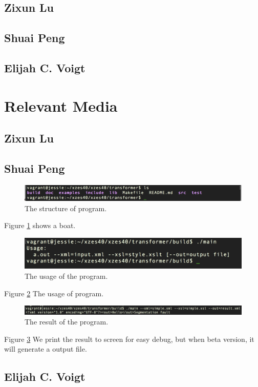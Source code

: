 \subsection{Zixun Lu}

\subsection{Shuai Peng}

\subsection{Elijah C. Voigt}


\section{Relevant Media}

\subsection{Zixun Lu}

\subsection{Shuai Peng}

\begin{figure}
  \includegraphics[width=\linewidth]{./figures/dir_of_program.png}
  \caption{The structure of program.}
  \label{fig:screen1}
\end{figure}
Figure \ref{fig:screen1} shows a boat.

\begin{figure}
  \includegraphics[width=\linewidth]{./figures/usage_of_program.png}
  \caption{The usage of the program.}
  \label{fig:screen2}
\end{figure}
Figure \ref{fig:screen2} The usage of program.

\begin{figure}
  \includegraphics[width=\linewidth]{./figures/result_of_program.png}
  \caption{The result of the program.}
  \label{fig:screen3}
\end{figure}
Figure \ref{fig:screen3} We print the result to screen for easy debug, but when beta version, it will generate a output file.


\subsection{Elijah C. Voigt}

\printbibliography


